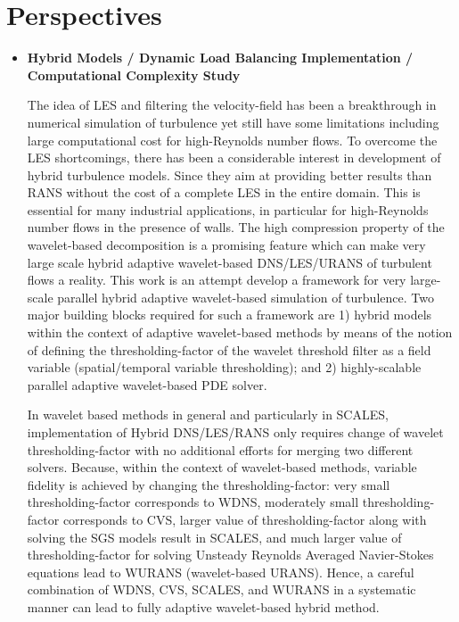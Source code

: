 \chapter{ Perspectives}
\label{resultchapter}




\begin{itemize}

  \item \textbf{Hybrid Models / Dynamic Load Balancing Implementation / Computational Complexity Study} {
  
The idea of LES and filtering the velocity-field has been a breakthrough in numerical simulation of turbulence
yet still have some limitations including large computational cost for high-Reynolds number flows.
To overcome the LES shortcomings, there has been a considerable interest in development of hybrid turbulence models.
Since they aim at providing better results than RANS without the cost of a complete LES in the entire domain.
This is essential for many industrial applications, in particular for high-Reynolds number flows in the presence of walls.
%
The high compression property of the wavelet-based decomposition
is a promising feature which can make very large scale hybrid adaptive wavelet-based DNS/LES/URANS of turbulent flows a reality.
%
This work is an attempt develop a framework for
very large-scale parallel hybrid adaptive wavelet-based simulation of turbulence.
%
Two major building blocks required for such a framework are
1) hybrid models within the context of adaptive wavelet-based methods by means of the notion of defining the thresholding-factor of the wavelet
threshold filter as a field variable (spatial/temporal variable thresholding); and
2) highly-scalable parallel adaptive wavelet-based PDE solver.





In wavelet based methods in general and particularly in SCALES,
implementation of Hybrid DNS/LES/RANS only requires change of wavelet thresholding-factor
with no additional efforts for merging two different solvers.
%
Because, within the context of wavelet-based methods, variable fidelity is achieved by changing the thresholding-factor:
very small thresholding-factor corresponds to WDNS,
moderately small thresholding-factor corresponds to CVS,
larger value of thresholding-factor along with solving the SGS models result in SCALES, and
much larger value of thresholding-factor for solving Unsteady Reynolds Averaged Navier-Stokes equations lead to
WURANS\cite{AIAA_2006} (wavelet-based URANS).
%
Hence, a careful combination of WDNS, CVS, SCALES, and WURANS in a systematic manner can lead to fully adaptive wavelet-based hybrid method.

}
\end{itemize}
